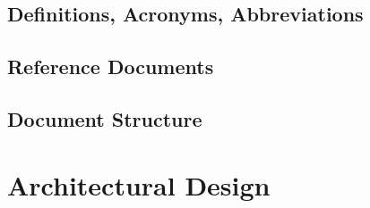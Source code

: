 \documentclass[12pt, letterpaper]{article}
\begin{document}
\subsection{Definitions, Acronyms, Abbreviations}




\subsection{Reference Documents} 



\subsection{Document Structure}

\section{Architectural Design} 








\newpage
\end{document}
